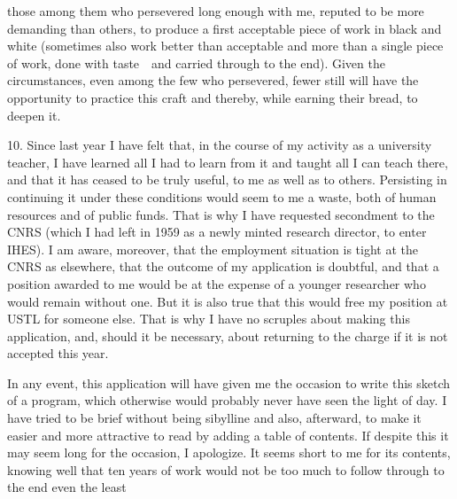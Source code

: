 
those among them who persevered long enough with me, reputed
to be more demanding than others, to produce a first acceptable
piece of work in black and white (sometimes also work better
than acceptable and more than a single piece of work, done with taste\ \ and
carried through to the end). Given the circumstances, even among the few who
persevered, fewer still will have the opportunity
to practice this craft and thereby, while earning their bread,
to deepen it.

10. Since last year I have felt that, in the course of my
activity as a university teacher, I have learned all I had
to learn from it and taught all I can teach there, and
that it has ceased to be truly useful, to me as well as to
others. Persisting in continuing it under these conditions would
seem to me a waste, both of human resources and of public
funds. That is why I have requested secondment to the CNRS (which
I had left in 1959 as a newly minted research director,
to enter IHES). I am aware, moreover, that the employment
situation is tight at the CNRS as elsewhere, that the outcome of my
application is doubtful, and that a position awarded to me would
be at the expense of a younger researcher who would remain without one.
But it is also true that this would free my position at USTL
for someone else. That is why I have no scruples about
making this application, and, should it be necessary, about returning to the charge
if it is not accepted this year.

In any event, this application will have given me
the occasion to write this sketch of a program, which otherwise would
probably never have seen the light of day. I have tried to be brief without being
sibylline and also, afterward, to make it easier and
more attractive to read by adding a table of contents. If despite
this it may seem long for the occasion, I apologize.
It seems short to me for its contents, knowing well that ten years of
work would not be too much to follow through to the end even the least

